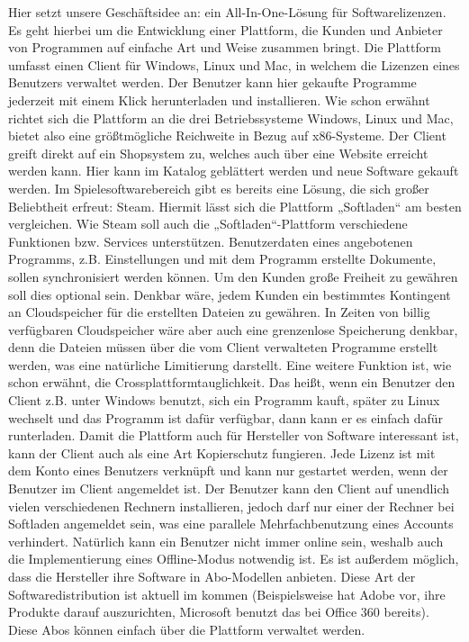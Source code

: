 Hier setzt unsere Geschäftsidee an: ein All-In-One-Lösung für Softwarelizenzen. Es geht hierbei um die Entwicklung einer Plattform, die Kunden und Anbieter von Programmen auf einfache Art und Weise zusammen bringt. Die Plattform umfasst einen Client für Windows, Linux und Mac, in welchem die Lizenzen eines Benutzers verwaltet werden. Der Benutzer kann hier gekaufte Programme jederzeit mit einem Klick herunterladen und installieren. Wie schon erwähnt richtet sich die Plattform an die drei Betriebssysteme Windows, Linux und Mac, bietet also eine größtmögliche Reichweite in Bezug auf x86-Systeme. Der Client greift direkt auf ein Shopsystem zu, welches auch über eine Website erreicht werden kann. Hier kann im Katalog geblättert werden und neue Software gekauft werden. Im Spielesoftwarebereich gibt es bereits eine Lösung, die sich großer Beliebtheit erfreut: Steam. Hiermit lässt sich die Plattform „Softladen“ am besten vergleichen. Wie Steam soll auch die „Softladen“-Plattform verschiedene Funktionen bzw. Services unterstützen. Benutzerdaten eines angebotenen Programms, z.B. Einstellungen und mit dem Programm erstellte Dokumente, sollen synchronisiert werden können. Um den Kunden große Freiheit zu gewähren soll dies optional sein. Denkbar wäre, jedem Kunden ein bestimmtes Kontingent an Cloudspeicher für die erstellten Dateien zu gewähren. In Zeiten von billig verfügbaren Cloudspeicher wäre aber auch eine grenzenlose Speicherung denkbar, denn die Dateien müssen über die vom Client verwalteten Programme erstellt werden, was eine natürliche Limitierung darstellt. 
Eine weitere Funktion ist, wie schon erwähnt, die Crossplattformtauglichkeit. Das heißt, wenn ein Benutzer den Client z.B. unter Windows benutzt, sich ein Programm kauft, später zu Linux wechselt und das Programm ist dafür verfügbar, dann kann er es einfach dafür runterladen.
Damit die Plattform auch für Hersteller von Software interessant ist, kann der Client auch als eine Art Kopierschutz fungieren. Jede Lizenz ist mit dem Konto eines Benutzers verknüpft und kann nur gestartet werden, wenn der Benutzer im Client angemeldet ist. Der Benutzer kann den Client auf unendlich vielen verschiedenen Rechnern installieren, jedoch darf nur einer der Rechner bei Softladen angemeldet sein, was eine parallele Mehrfachbenutzung eines Accounts verhindert. Natürlich kann ein Benutzer nicht immer online sein, weshalb auch die Implementierung eines Offline-Modus notwendig ist. Es ist außerdem möglich, dass die Hersteller ihre Software in Abo-Modellen anbieten. Diese Art der Softwaredistribution ist aktuell im kommen (Beispielsweise hat Adobe vor, ihre Produkte darauf auszurichten, Microsoft benutzt das bei Office 360 bereits). Diese Abos können einfach über die Plattform verwaltet werden.
